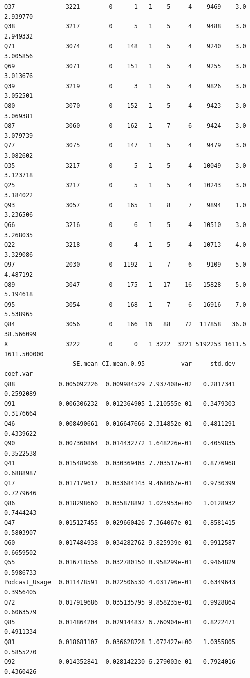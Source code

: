 \documentclass[
]{report}
\begin{document}
\begin{verbatim}
Q37              3221        0      1   1    5     4    9469    3.0    2.939770
Q38              3217        0      5   1    5     4    9488    3.0    2.949332
Q71              3074        0    148   1    5     4    9240    3.0    3.005856
Q69              3071        0    151   1    5     4    9255    3.0    3.013676
Q39              3219        0      3   1    5     4    9826    3.0    3.052501
Q80              3070        0    152   1    5     4    9423    3.0    3.069381
Q87              3060        0    162   1    7     6    9424    3.0    3.079739
Q77              3075        0    147   1    5     4    9479    3.0    3.082602
Q35              3217        0      5   1    5     4   10049    3.0    3.123718
Q25              3217        0      5   1    5     4   10243    3.0    3.184022
Q93              3057        0    165   1    8     7    9894    1.0    3.236506
Q66              3216        0      6   1    5     4   10510    3.0    3.268035
Q22              3218        0      4   1    5     4   10713    4.0    3.329086
Q97              2030        0   1192   1    7     6    9109    5.0    4.487192
Q89              3047        0    175   1   17    16   15828    5.0    5.194618
Q95              3054        0    168   1    7     6   16916    7.0    5.538965
Q84              3056        0    166  16   88    72  117858   36.0   38.566099
X                3222        0      0   1 3222  3221 5192253 1611.5 1611.500000
                   SE.mean CI.mean.0.95          var     std.dev  coef.var
Q88            0.005092226  0.009984529 7.937408e-02   0.2817341 0.2592089
Q91            0.006306232  0.012364905 1.210555e-01   0.3479303 0.3176664
Q46            0.008490661  0.016647666 2.314852e-01   0.4811291 0.4339622
Q90            0.007360864  0.014432772 1.648226e-01   0.4059835 0.3522538
Q41            0.015489036  0.030369403 7.703517e-01   0.8776968 0.6888987
Q17            0.017179617  0.033684143 9.468067e-01   0.9730399 0.7279646
Q86            0.018298660  0.035878892 1.025953e+00   1.0128932 0.7444243
Q47            0.015127455  0.029660426 7.364067e-01   0.8581415 0.5803907
Q60            0.017484938  0.034282762 9.825939e-01   0.9912587 0.6659502
Q55            0.016718556  0.032780150 8.958299e-01   0.9464829 0.5986733
Podcast_Usage  0.011478591  0.022506530 4.031796e-01   0.6349643 0.3956405
Q72            0.017919686  0.035135795 9.858235e-01   0.9928864 0.6063579
Q85            0.014864204  0.029144837 6.760904e-01   0.8222471 0.4911334
Q81            0.018681107  0.036628728 1.072427e+00   1.0355805 0.5855270
Q92            0.014352841  0.028142230 6.279003e-01   0.7924016 0.4360426

\end{verbatim}
\end{document}
